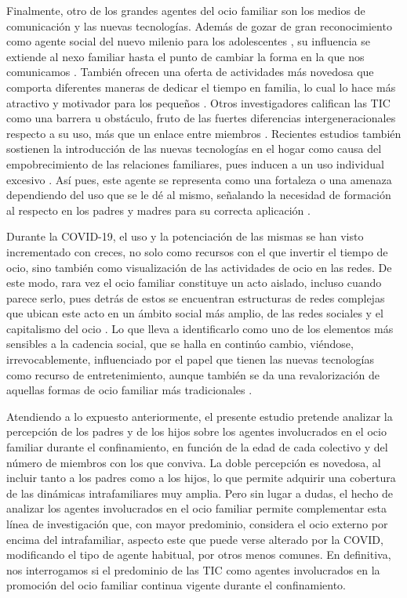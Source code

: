 \documentclass{textolivre}
\begin{document}
Finalmente, otro de los grandes agentes del ocio familiar son los medios de comunicación y las nuevas tecnologías. Además de gozar de gran reconocimiento como agente social del nuevo milenio para los adolescentes \cite{gomes2014}, su influencia se extiende al nexo familiar hasta el punto de cambiar la forma en la que nos comunicamos \cite{orchard2010}. También ofrecen una oferta de actividades más novedosa que comporta diferentes maneras de dedicar el tiempo en familia, lo cual lo hace más atractivo y motivador para los pequeños \cite{godfrey2009}. Otros investigadores califican las TIC como una barrera u obstáculo, fruto de las fuertes diferencias intergeneracionales respecto a su uso, más que un enlace entre miembros \cite{fernandezmontalvo2015}. Recientes estudios también sostienen la introducción de las nuevas tecnologías en el hogar como causa del empobrecimiento de las relaciones familiares, pues inducen a un uso individual excesivo \cite{carvalho2015}. Así pues, este agente se representa como una fortaleza o una amenaza dependiendo del uso que se le dé al mismo, señalando la necesidad de formación al respecto en los padres y madres para su correcta aplicación \cite{wang2015}. 

Durante la COVID-19, el uso y la potenciación de las mismas se han visto incrementado con creces, no solo como recursos con el que invertir el tiempo de ocio, sino también como visualización de las actividades de ocio en las redes. De este modo, rara vez el ocio familiar constituye un acto aislado, incluso cuando parece serlo, pues detrás de estos se encuentran estructuras de redes complejas que ubican este acto en un ámbito social más amplio, de las redes sociales y el capitalismo del ocio \cite{bond2020}. Lo que lleva a identificarlo como uno de los elementos más sensibles a la cadencia social, que se halla en continúo cambio, viéndose, irrevocablemente, influenciado por el papel que tienen las nuevas tecnologías como recurso de entretenimiento, aunque también se da una revalorización de aquellas formas de ocio familiar más tradicionales \cite{vanleeuwen2020}. 

Atendiendo a lo expuesto anteriormente, el presente estudio pretende analizar la percepción de los padres y de los hijos sobre los agentes involucrados en el ocio familiar durante el confinamiento, en función de la edad de cada colectivo y del número de miembros con los que conviva. La doble percepción es novedosa, al incluir tanto a los padres como a los hijos, lo que permite adquirir una cobertura de las dinámicas intrafamiliares muy amplia. Pero sin lugar a dudas, el hecho de analizar los agentes involucrados en el ocio familiar permite complementar esta línea de investigación que, con mayor predominio, considera el ocio externo por encima del intrafamiliar, aspecto este que puede verse alterado por la COVID, modificando el tipo de agente habitual, por otros menos comunes. En definitiva, nos interrogamos si el predominio de las TIC como agentes involucrados en la promoción del ocio familiar continua vigente durante el confinamiento.
\end{document}
